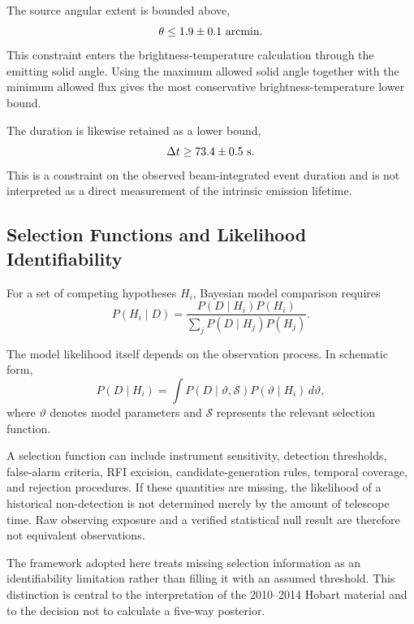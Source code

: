 \documentclass[twocolumn]{aastex701}
\begin{document}
The source angular extent is bounded above,
\[
\theta\leq1.9\pm0.1~{\rm arcmin}.
\]
This constraint enters the brightness-temperature calculation through the emitting solid angle. Using the maximum allowed solid angle together with the minimum allowed flux gives the most conservative brightness-temperature lower bound.

The duration is likewise retained as a lower bound,
\[
\Delta t\geq73.4\pm0.5~{\rm s}.
\]
This is a constraint on the observed beam-integrated event duration and is not interpreted as a direct measurement of the intrinsic emission lifetime.

\subsection{Selection Functions and Likelihood Identifiability}

For a set of competing hypotheses $H_i$, Bayesian model comparison requires
\begin{equation}
P(H_i\mid D)=
\frac{P(D\mid H_i)P(H_i)}
{\sum_j P(D\mid H_j)P(H_j)}.
\end{equation}

The model likelihood itself depends on the observation process. In schematic form,
\begin{equation}
P(D\mid H_i)=
\int P(D\mid\vartheta,\mathcal{S})
P(\vartheta\mid H_i)\,d\vartheta,
\label{eq:general_likelihood}
\end{equation}
where $\vartheta$ denotes model parameters and $\mathcal{S}$ represents the relevant selection function.

A selection function can include instrument sensitivity, detection thresholds, false-alarm criteria, RFI excision, candidate-generation rules, temporal coverage, and rejection procedures. If these quantities are missing, the likelihood of a historical non-detection is not determined merely by the amount of telescope time. Raw observing exposure and a verified statistical null result are therefore not equivalent observations.

The framework adopted here treats missing selection information as an identifiability limitation rather than filling it with an assumed threshold. This distinction is central to the interpretation of the 2010--2014 Hobart material and to the decision not to calculate a five-way posterior.

\end{document}
